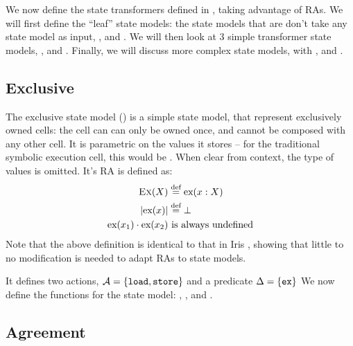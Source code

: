 We now define the state transformers defined in \cite{sacha-phd}, taking advantage of RAs. We will first define the ``leaf'' state models: the state models that are don't take any state model as input, \Ex, \Ag{} and \Frac. We will then look at 3 simple transformer state models, \Sum, \Product{} and \PProduct{}. Finally, we will discuss more complex state models, with \Freeable, \PMap{} and \List.

\subsection{Exclusive}

The exclusive state model \Ex{}(\Val) is a simple state model, that represent exclusively owned cells: the cell can can only be owned once, and cannot be composed with any other cell. It is parametric on the values it stores -- for the traditional symbolic execution cell, this would be . When clear from context, the type of values is omitted. It's RA is defined as: \begin{align*}
 	\textsc{Ex}(X) &\stackrel{\textnormal{def}}=	\text{ex}(x: X)\\
 	|\text{ex}(x)| &\stackrel{\textnormal{def}}= \bot\\
 	\text{ex}(x_1) \cdot \text{ex}(x_2)&~\text{is always undefined}
 \end{align*}
 Note that the above definition is identical to that in Iris \cite{iris}, showing that little to no modification is needed to adapt RAs to state models.

It defines two actions, ${\cal{A}}=\{\texttt{load}, \texttt{store}\}$ and a predicate $\Delta=\{\texttt{ex}\}$  We now define the functions for the state model: \execac, \produce, \consume{} and \fix.

\subsection{Agreement}

